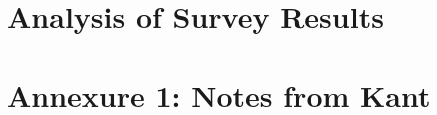 \documentclass[12pt, a4paper]{report}
\begin{document}
\chapter[Analysis]{Analysis of Survey Results}              %
\label{chap:analysis}


\label{chap:bibs}
\printbibliography
{}

\appendix                                                     %
\chapter{Annexure 1: Notes from Kant}                          %
\kant[23-24]
\end{document}
